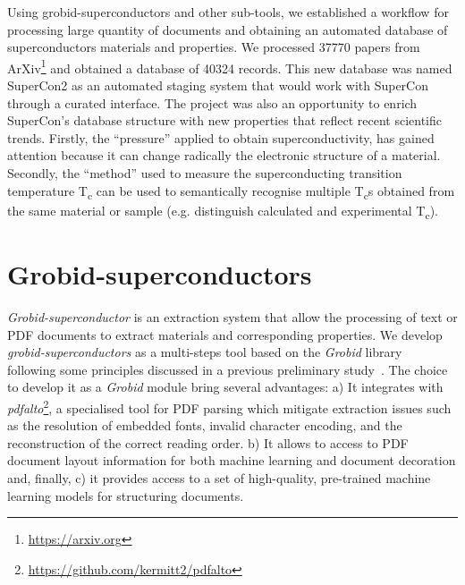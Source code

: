 \documentclass{article}
\begin{document}
Using grobid-superconductors and other sub-tools, we established a workflow for processing large quantity of documents and obtaining an automated database of superconductors materials and properties. 
We processed 37770 papers from ArXiv\footnote{\url{https://arxiv.org}} and obtained a database of 40324 records. 
This new database was named SuperCon2 as an automated staging system that would work with SuperCon through a curated interface. 
The project was also an opportunity to enrich SuperCon's database structure with new properties that reflect recent scientific trends.
Firstly, the ``pressure'' applied to obtain superconductivity, has gained attention because it can change radically the electronic structure of a material. 
Secondly, the ``method'' used to measure the superconducting transition temperature T\textsubscript{c} can be used to semantically recognise multiple T\textsubscript{c}s obtained from the same material or sample (e.g. distinguish calculated and experimental T\textsubscript{c}). 


\section{Grobid-superconductors}

\textit{Grobid-superconductor} is an extraction system that allow the processing of text or PDF documents to extract materials and corresponding properties. 
We develop \textit{grobid-superconductors} as a multi-steps tool based on the \textit{Grobid} library~\cite{GROBID} following some principles discussed in a previous preliminary study~\cite{foppiano:hal-02870896}.  
The choice to develop it as a \textit{Grobid} module bring several advantages: a) It integrates with \textit{pdfalto}\footnote{\url{https://github.com/kermitt2/pdfalto}}, a specialised tool for PDF parsing which mitigate extraction issues such as the resolution of embedded fonts, invalid character encoding, and the reconstruction of the correct reading order. b) It allows to access to PDF document layout information for both machine learning and document decoration and, finally, c) it provides access to a set of high-quality, pre-trained machine learning models for structuring documents.
\end{document}
